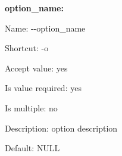 {\bfseries option\+\_\+name\+:}


\begin{DoxyItemize}
\item Name\+: {\ttfamily -\/-\/option\+\_\+name}
\item Shortcut\+: {\ttfamily -\/o}
\item Accept value\+: yes
\item Is value required\+: yes
\item Is multiple\+: no
\item Description\+: option description
\item Default\+: {\ttfamily N\+U\+L\+L} 
\end{DoxyItemize}